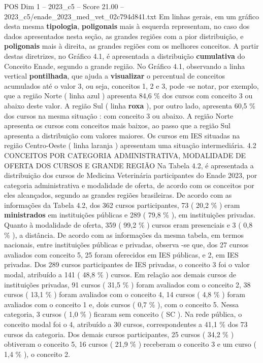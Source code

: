 \begin{textsample}{POS Dim 1 – 2023\_c5 – Score 21.00 – 2023\_c5/enade\_2023\_med\_vet\_02c794d841.txt}
Em linhas gerais, em um gráfico desta mesma \textbf{tipologia}, \textbf{poligonais} mais à esquerda representam, no caso dos dados apresentados nesta seção, as grandes regiões com a pior distribuição, e \textbf{poligonais} mais à direita, as grandes regiões com os melhores conceitos.
A partir destas diretrizes, no Gráfico 4.1, é apresentada a distribuição \textbf{cumulativa} do Conceito Enade, segundo a grande região.
No Gráfico 4.1, observando a linha vertical \textbf{pontilhada}, que ajuda a \textbf{visualizar} o percentual de conceitos acumulados até o valor 3, ou seja, conceitos 1, 2 e 3, pode -se notar, por exemplo, que a região Norte ( linha azul ) apresenta 84,6 \% dos cursos com conceito 3 ou abaixo deste valor.
A região Sul ( linha \textbf{roxa} ), por outro lado, apresenta 60,5 \% dos cursos na mesma situação : com conceito 3 ou abaixo.
A região Norte apresenta os cursos com conceitos mais baixos, ao passo que a região Sul apresenta a distribuição com valores maiores.
Os cursos em IES situadas na região Centro-Oeste ( linha laranja ) apresentam uma situação intermediária. 4.2 CONCEITOS POR CATEGORIA ADMINISTRATIVA, MODALIDADE DE OFERTA DOS CURSOS E GRANDE REGIÃO Na Tabela 4.2, é apresentada a distribuição dos cursos de Medicina Veterinária participantes do Enade 2023, por categoria administrativa e modalidade de oferta, de acordo com os conceitos por eles alcançados, segundo as grandes regiões brasileiras.
De acordo com as informações da Tabela 4.2, dos 362 cursos participantes, 73 ( 20,2 \% ) eram \textbf{ministrados} em instituições públicas e 289 ( 79,8 \% ), em instituições privadas.
Quanto à modalidade de oferta, 359 ( 99,2 \% ) cursos eram presenciais e 3 ( 0,8 \% ), a distância.
De acordo com as informações da mesma tabela, em termos nacionais, entre instituições públicas e privadas, observa -se que, dos 27 cursos avaliados com conceito 5, 25 foram oferecidos em IES públicas, e 2, em IES privadas.
Dos 289 cursos participantes de IES privadas, o conceito 3 foi o valor modal, atribuído a 141 ( 48,8 \% ) cursos.
Em relação aos demais cursos de instituições privadas, 91 cursos ( 31,5 \% ) foram avaliados com o conceito 2, 38 cursos ( 13,1 \% ) foram avaliados com o conceito 4, 14 cursos ( 4,8 \% ) foram avaliados com o conceito 1 e, dois cursos ( 0,7 \% ), com o conceito 5.
Nessa categoria, 3 cursos ( 1,0 \% ) ficaram sem conceito ( SC ).
Na rede pública, o conceito modal foi o 4, atribuído a 30 cursos, correspondentes a 41,1 \% dos 73 cursos da categoria.
Dos demais cursos participantes, 25 cursos ( 34,2 \% ) obtiveram o conceito 5, 16 cursos ( 21,9 \% ) receberam o conceito 3 e um curso ( 1,4 \% ), o conceito 2.

\end{textsample}
